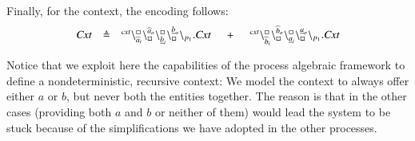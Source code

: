 Finally, for the context, the encoding follows:
\[
\begin{array}{lcl @{\hspace{0.5cm}}c@{\hspace{0.5cm}} l}
\mathit{Cxt} &\defeq &  \startchain{\mathit{cxt}}\chainedlink{\widehat{a}_i}{\noact}\chainedlink{\noact}{\widehat{a}_o}\chainedlink{\underline{b}_i}{\noact}\chainedlink{\noact}{\underline{b}_o}\chainend{p_1}.\mathit{Cxt}
&+
&\startchain{\mathit{cxt}}\chainedlink{\widehat{b}_i}{\noact}\chainedlink{\noact}{\widehat{b}_o}\chainedlink{\underline{a}_i}{\noact}\chainedlink{\noact}{\underline{a}_o}\chainend{p_1}.\mathit{Cxt}\\
\end{array}
\]

Notice that we exploit here the capabilities of the process algebraic framework to define a nondeterministic, recursive context:
We model the context to always offer either $a$ or $b$, but never both the entities together. The reason is that in
the other cases (providing both $a$ and $b$ or neither of them) would lead the system to be stuck because of the simplifications we have adopted in the other processes.

